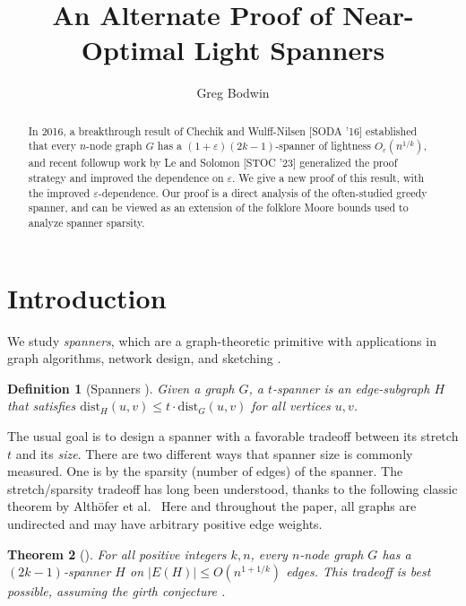 \documentclass{article}\usepackage[a4paper,margin=20mm]{geometry}
\title{An Alternate Proof of Near-Optimal Light Spanners}
\author{Greg Bodwin}\date{}
\newtheorem{theorem}{Theorem}\newtheorem{lemma}[theorem]{Lemma}\newtheorem{proposition}[theorem]{Proposition}\newtheorem{corollary}[theorem]{Corollary}\newtheorem{definition}[theorem]{Definition}\newtheorem{claim}[theorem]{Claim}\newtheorem{remark}[theorem]{Remark}\newtheorem{observation}[theorem]{Observation}\newtheorem{conjecture}[theorem]{Conjecture}\newtheorem{example}[theorem]{Example}
\newcommand{\eps}{\varepsilon}
\newcommand{\dist}{\text{dist}}
\newcommand{\Althofer}{Alth\"{o}fer}
\begin{document}
\maketitle

\begin{abstract}
In 2016, a breakthrough result of Chechik and Wulff-Nilsen [SODA '16] established that every $n$-node graph $G$ has a $(1+\eps)(2k-1)$-spanner of lightness $O_{\eps}(n^{1/k})$, and recent followup work by Le and Solomon [STOC '23] generalized the proof strategy and improved the dependence on $\eps$.
We give a new proof of this result, with the improved $\eps$-dependence.
Our proof is a direct analysis of the often-studied greedy spanner, and can be viewed as an extension of the folklore Moore bounds used to analyze spanner sparsity.
\end{abstract}

\section{Introduction}

We study \emph{spanners}, which are a graph-theoretic primitive with applications in graph algorithms, network design, and sketching \cite{ABSHJKS20}.
\begin{definition}[Spanners \cite{PU89jacm,PU89sicomp}]
Given a graph $G$, a $t$-spanner is an edge-subgraph $H$ that satisfies
$\dist_H(u, v) \le t \cdot \dist_G(u, v)$ for all vertices $u, v$.
\end{definition}

The usual goal is to design a spanner with a favorable tradeoff between its stretch $t$ and its \emph{size}.
There are two different ways that spanner size is commonly measured.
One is by the sparsity (number of edges) of the spanner.
The stretch/sparsity tradeoff has long been understood, thanks to the following classic theorem by \Althofer{} et al.~\cite{ADDJS93}
Here and throughout the paper, all graphs are undirected and may have arbitrary positive edge weights.
\begin{theorem} [\cite{ADDJS93}] \label{thm:sotasparse}
For all positive integers $k, n$, every $n$-node graph $G$ has a $(2k-1)$-spanner $H$ on $|E(H)| \le O(n^{1+1/k})$ edges.
This tradeoff is best possible, assuming the girth conjecture \cite{girth}.
\end{theorem}
\end{document}
